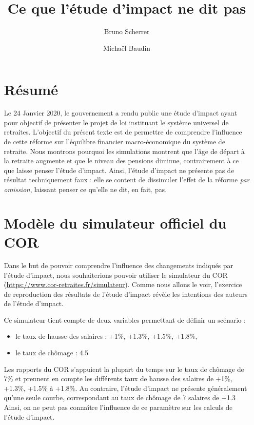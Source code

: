 \documentclass[10pt]{article}
\title{Ce que l'étude d'impact ne dit pas}
\author{Bruno Scherrer \and Michaël Baudin}
\begin{document}
\maketitle

\section{Résumé}

Le 24 Janvier 2020, le gouvernement a rendu public une 
étude d'impact ayant pour objectif de présenter le projet 
de loi instituant le système universel de retraites. 
L'objectif du présent texte est de permettre de comprendre 
l'influence de cette réforme sur l'équilibre financier macro-économique 
du système de retraite. 
Nous montrons pourquoi les simulations montrent que l'âge de départ à la 
retraite augmente et que le niveau des pensions diminue, contrairement à ce que laisse 
penser l'étude d'impact. 
Ainsi, l'étude d'impact ne présente pas de résultat techniquement faux : 
elle se content de dissimuler l'effet de la réforme \emph{par omission}, 
laissant penser ce qu'elle ne dit, en fait, pas. 


\section{Modèle du simulateur officiel du COR}

Dans le but de pouvoir comprendre l'influence des changements indiqués par 
l'étude d'impact, nous souhaiterions pouvoir utiliser le simulateur du COR 
(\url{https://www.cor-retraites.fr/simulateur}). 
Comme nous allons le voir, l'exercice de reproduction des résultats 
de l'étude d'impact révèle les intentions des auteurs de l'étude d'impact. 

Ce simulateur tient compte de deux variables permettant de définir un scénario :
\begin{itemize}
\item le taux de hausse des salaires : +1\%, +1.3\%, +1.5\%, +1.8\%, 
\item le taux de chômage : 4.5%
\end{itemize}

Les rapports du COR s'appuient la plupart du temps sur le taux 
de chômage de 7\% et prennent en compte les différents taux de hausse 
des salaires de +1\%, +1.3\%, +1.5\% à +1.8\%. 
Au contraire, l'étude d'impact ne présente généralement qu'une seule 
courbe, correspondant au taux de chômage de 7%
salaires de +1.3%
Ainsi, on ne peut pas connaître l'influence de ce paramètre sur les calculs 
de l'étude d'impact. 
\end{document}
